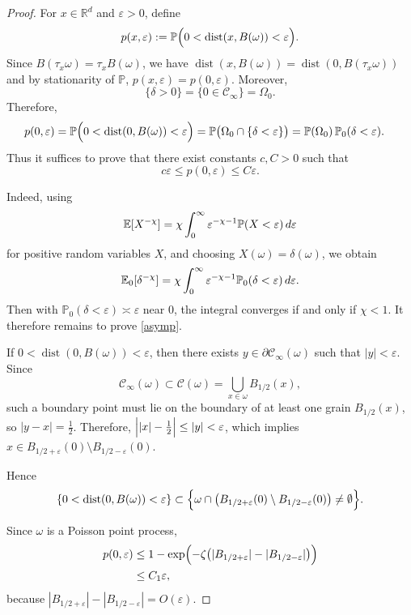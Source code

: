 \documentclass[10pt,a4paper]{amsart}
\newcommand{\E}{\mathbb E}
\renewcommand{\P}{\mathbb P}
\renewcommand{\d}{{\rm d}}
\newcommand{\dist}{\mathop{\mathrm{dist}}}
\begin{document}
\begin{proof}
For $x\in\mathbb R^d$ and $\varepsilon>0$, define
\begin{equation}\label{def p}
p(x,\varepsilon)
:=
\P\Bigl(
0<
\dist(x,B(\omega))
<
\varepsilon
\Bigr).
\end{equation}
Since $B(\tau_x\omega)=\tau_x B(\omega)$,
we have $\dist(x,B(\omega))
=
\dist(0,B(\tau_x\omega))$ and 
by stationarity of $\P$, $p(x,\varepsilon)=p(0,\varepsilon)$.
Moreover,
\[
\{\delta>0\}
=
\{0\in\mathcal C_\infty\}
=
\Omega_0.
\]
Therefore,
\begin{equation}\label{rel}
\begin{aligned}
p(0,\varepsilon)
=
\P\Bigl(
0<
\dist(0,B(\omega))
<
\varepsilon
\Bigr)
&=
\P\bigl(
\Omega_0\cap\{\delta<\varepsilon\}
\bigr)
=
\P(\Omega_0)\,
\P_0(\delta<\varepsilon).
\end{aligned}
\end{equation}
Thus it suffices to prove that there exist constants $c,C>0$ such that
\begin{equation}\label{asymp}
c\varepsilon
\le
p(0,\varepsilon)
\le
C\varepsilon.
\end{equation}

Indeed, using
\[
\E[X^{-\chi}]
=
\chi\int_0^\infty
\varepsilon^{-\chi-1}
\P(X<\varepsilon)
\,\d\varepsilon
\]
for positive random variables $X$, and choosing
$X(\omega)=\delta(\omega)$,
we obtain
$$
\E_0[\delta^{-\chi}]
=
\chi
\int_0^\infty
\varepsilon^{-\chi-1}
\P_0(\delta<\varepsilon)
\,\d\varepsilon.
$$
Then with $\P_0(\delta<\varepsilon)\asymp\varepsilon$ 
near $0$, the integral converges if and only if $\chi<1$.
It therefore remains to prove \eqref{asymp}.

\medskip

If $0<
\dist(0,B(\omega))
<
\varepsilon$,
then there exists
$y\in\partial\mathcal C_\infty(\omega)$
such that $|y|<\varepsilon$. Since
\[
\mathcal C_\infty(\omega)
\subset
\mathcal C(\omega)
=
\bigcup_{x\in\omega}B_{1/2}(x),
\]
such a boundary point must lie on the boundary of at least one grain
$B_{1/2}(x)$, so
$|y-x|=\frac12$. Therefore,
$\Bigl||x|-\frac12\Bigr|
\leq
|y|
<
\varepsilon$, 
which implies
$x\in
B_{1/2+\varepsilon}(0)
\setminus
B_{1/2-\varepsilon}(0)$.

Hence
\[
\{0<\dist(0,B(\omega))<\varepsilon\}
\subset
\Bigl\{
\omega\cap
\bigl(
B_{1/2+\varepsilon}(0)
\setminus
B_{1/2-\varepsilon}(0)
\bigr)
\neq\emptyset
\Bigr\}.
\]

Since $\omega$ is a Poisson point process,
\[
\begin{aligned}
p(0,\varepsilon)
&\le
1-
\exp\Bigl(
-\zeta
\bigl(
|B_{1/2+\varepsilon}|
-
|B_{1/2-\varepsilon}|
\bigr)
\Bigr)
\\
&\le
C_1\varepsilon,
\end{aligned}
\]
because $|B_{1/2+\varepsilon}|
-
|B_{1/2-\varepsilon}|
=
O(\varepsilon)$.



\end{proof}
\end{document}
